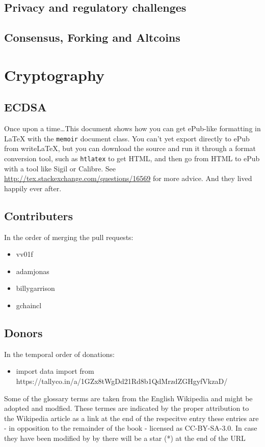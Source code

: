 \documentclass[a4paper,12pt,oneside,openany]{book}
\begin{document}
\section{Privacy and regulatory challenges}
\section{Consensus, Forking and Altcoins}


\appendix
\chapter{Cryptography}
\section{ECDSA}

Once upon a time\ldots This document shows how you can get ePub-like formatting in \LaTeX{} with the \verb|memoir| document class. You can't yet export directly to ePub from writeLaTeX, but you can download the source and run it through a format conversion tool, such as \verb|htlatex| to get HTML, and then go from HTML to ePub with a tool like Sigil or Calibre. See \url{http://tex.stackexchange.com/questions/16569} for more advice. And they lived happily ever after.

\appendix
\section{Contributers}
In the order of merging the pull requests:
\begin{itemize}
\item vv01f
\item adamjonas
\item billygarrison
\item gchaincl
\end{itemize}

\section{Donors}
In the temporal order of donations:
\begin{itemize}
\item import data import from https://tallyco.in/a/1GZx8tWgDd21Rd8b1QdMrzdZGHgyfVkzaD/


\end{itemize}

\glsaddall

Some of the glossary terms are taken from the English Wikipedia and might be adopted and modfied. These termes are indicated by the proper attribution to the Wikipedia article as a link at the end of the respecitve entry these entries are - in opposition to the remainder of the book - licensed as CC-BY-SA-3.0. In case they have been modified by by there will be a star (*) at the end of the URL

\printnoidxglossaries
\end{document}
